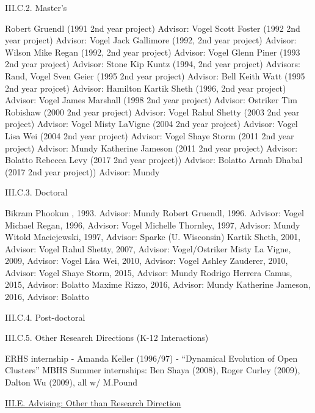\documentclass[11pt,letterpaper]{article}
\newcommand{\newi}{\newline\indent}
\begin{document}
          
III.C.2. Master's


Robert Gruendl (1991 2nd year project) Advisor:  Vogel\newi
Scott Foster (1992 2nd year project) Advisor:  Vogel\newi
Jack Gallimore (1992, 2nd year project) Advisor:  Wilson\newi
Mike Regan (1992, 2nd year project) Advisor: Vogel\newi
Glenn Piner (1993 2nd year project) Advisor: Stone\newi
Kip Kuntz (1994, 2nd year project) Advisors:  Rand, Vogel\newi
Sven Geier (1995 2nd year project) Advisor: Bell\newi
Keith Watt (1995 2nd year projcet) Advisor:  Hamilton\newi
Kartik Sheth (1996, 2nd year project) Advisor:  Vogel\newi
James Marshall (1998 2nd year project) Advisor:  Ostriker\newi
Tim Robishaw (2000  2nd year project)  Advisor:  Vogel\newi
Rahul Shetty (2003  2nd year project) Advisor:  Vogel\newi
Misty LaVigne (2004 2nd year project) Advisor: Vogel\newi
Lisa Wei (2004 2nd year project) Advisor: Vogel\newi
Shaye Storm (2011 2nd year project) Advisor: Mundy\newi
Katherine Jameson  (2011 2nd year project) Advisor: Bolatto\newi
Rebecca Levy (2017 2nd year project)) Advisor:  Bolatto\newi
Arnab Dhabal (2017 2nd year project)) Advisor: Mundy\newi
                
III.C.3. Doctoral

Bikram Phookun , 1993. Advisor: Mundy\newi
Robert Gruendl, 1996. Advisor: Vogel\newi
Michael Regan, 1996, Advisor: Vogel\newi
Michelle Thornley, 1997, Advisor: Mundy\newi
Witold Maciejewski, 1997, Advisor: Sparke (U. Wisconsin)\newi
Kartik Sheth, 2001, Advisor: Vogel\newi
Rahul Shetty, 2007, Advisor: Vogel/Ostriker\newi
Misty La Vigne, 2009, Advisor: Vogel\newi
Lisa Wei, 2010, Advisor: Vogel\newi
Ashley Zauderer, 2010, Advisor: Vogel\newi
Shaye Storm, 2015, Advisor: Mundy\newi
Rodrigo Herrera Camus, 2015, Advisor: Bolatto\newi
Maxime Rizzo, 2016, Advisor: Mundy\newi
Katherine Jameson, 2016, Advisor: Bolatto\newi
                
III.C.4. Post-doctoral


III.C.5. Other Research Directions (K-12 Interactions)

ERHS internship - Amanda Keller (1996/97) - ``Dynamical Evolution of  Open Clusters''\newi
MBHS Summer internships: Ben Shaya (2008), Roger Curley (2009), Dalton Wu  (2009), all w/ M.Pound\newi






\underline{III.E. Advising: Other than Research Direction}
\end{document}
